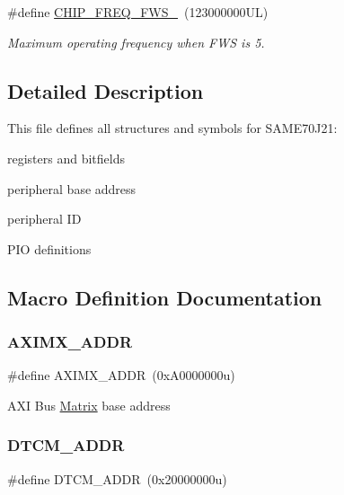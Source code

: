 \begin{DoxyCompactItemize}
\mbox{\label{group__SAME70J21__definitions_ga3b66824f858591135877b369f98d48a5}} 
\#define \mbox{\hyperlink{group__SAME70J21__definitions_ga3b66824f858591135877b369f98d48a5}{C\+H\+I\+P\+\_\+\+F\+R\+E\+Q\+\_\+\+F\+W\+S\+\_}}~(123000000\+U\+L)
\begin{DoxyCompactList}\small\item\em Maximum operating frequency when F\+WS is 5. \end{DoxyCompactList}\end{DoxyCompactItemize}


\subsection{Detailed Description}
This file defines all structures and symbols for S\+A\+M\+E70\+J21\+:
\begin{DoxyItemize}
\item registers and bitfields
\item peripheral base address
\item peripheral ID
\item P\+IO definitions 
\end{DoxyItemize}

\subsection{Macro Definition Documentation}
\mbox{\label{group__SAME70J21__definitions_ga2fb7cc681bf5e7fbce5e3635b72a330a}} 
\subsubsection{\texorpdfstring{AXIMX\_ADDR}{AXIMX\_ADDR}}
{\footnotesize\ttfamily \#define A\+X\+I\+M\+X\+\_\+\+A\+D\+DR~(0x\+A0000000u)}

A\+XI Bus \mbox{\hyperlink{structMatrix}{Matrix}} base address \mbox{\label{group__SAME70J21__definitions_ga26626a425f7ebb3a0c2dbc276f0d9f78}} 
\subsubsection{\texorpdfstring{DTCM\_ADDR}{DTCM\_ADDR}}
{\footnotesize\ttfamily \#define D\+T\+C\+M\+\_\+\+A\+D\+DR~(0x20000000u)}

